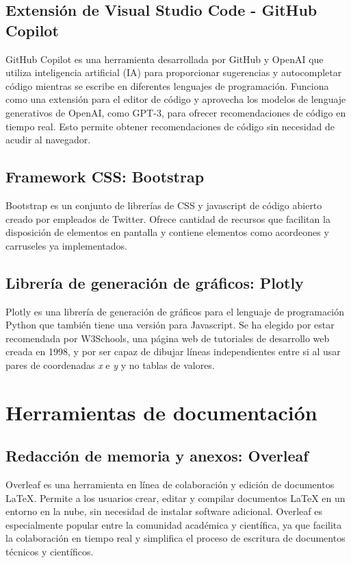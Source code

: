\subsection{Extensión de Visual Studio Code - GitHub Copilot}
GitHub Copilot es una herramienta desarrollada por GitHub y OpenAI que utiliza inteligencia artificial (IA) para proporcionar sugerencias y autocompletar código mientras se escribe en diferentes lenguajes de programación. Funciona como una extensión para el editor de código y aprovecha los modelos de lenguaje generativos de OpenAI, como GPT-3, para ofrecer recomendaciones de código en tiempo real.
Esto permite obtener recomendaciones de código sin necesidad de acudir al navegador.
\subsection{Framework CSS: Bootstrap}
Bootstrap es un conjunto de librerías de CSS y javascript de código abierto creado por empleados de Twitter. Ofrece cantidad de recursos que facilitan la disposición de elementos en pantalla y contiene elementos como acordeones y carruseles ya implementados.
\subsection{Librería de generación de gráficos: Plotly}
Plotly es una librería de generación de gráficos para el lenguaje de programación Python que también tiene una versión para Javascript. Se ha elegido por estar recomendada por W3Schools, una página web de tutoriales de desarrollo web creada en 1998, y por ser capaz de dibujar líneas independientes entre si al usar pares de coordenadas \textit{x} e \textit{y} y no tablas de valores.

\section{Herramientas de documentación}
\subsection{Redacción de memoria y anexos: Overleaf}
Overleaf es una herramienta en línea de colaboración y edición de documentos LaTeX. Permite a los usuarios crear, editar y compilar documentos LaTeX en un entorno en la nube, sin necesidad de instalar software adicional. Overleaf es especialmente popular entre la comunidad académica y científica, ya que facilita la colaboración en tiempo real y simplifica el proceso de escritura de documentos técnicos y científicos.
